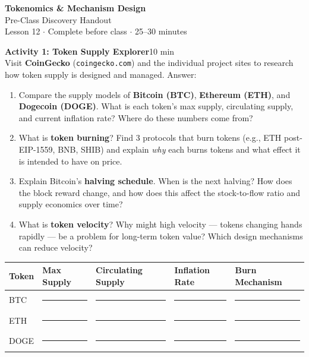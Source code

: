 \documentclass[11pt,a4paper]{article}
\newcommand{\activitybox}[3]{%
  \noindent\colorbox{mllavender4}{\parbox{\dimexpr\linewidth-2\fboxsep}{%
    \textbf{\color{mlpurple}#1}\hfill\textcolor{mlgray}{\small #2}\\[2pt]#3%
  }}\par\vspace{4pt}%
}
\newcommand{\fillcell}{\rule{2.2cm}{0.3pt}}
\begin{document}
\begin{center}
{\LARGE\color{mlpurple}\textbf{Tokenomics \& Mechanism Design}}\\[4pt]
{\large\color{mlblue}Pre-Class Discovery Handout}\\[2pt]
{\small\color{mlgray}Lesson 12 $\cdot$ Complete before class $\cdot$ 25--30 minutes}
\end{center}
\vspace{4pt}

\activitybox{Activity 1: Token Supply Explorer}{10 min}{%
Visit \textbf{CoinGecko} (\texttt{coingecko.com}) and the individual project sites to research how token supply is designed and managed. Answer:
\begin{enumerate}
\item Compare the supply models of \textbf{Bitcoin (BTC)}, \textbf{Ethereum (ETH)}, and \textbf{Dogecoin (DOGE)}. What is each token's max supply, circulating supply, and current inflation rate? Where do these numbers come from?
\item What is \textbf{token burning}? Find 3 protocols that burn tokens (e.g., ETH post-EIP-1559, BNB, SHIB) and explain \emph{why} each burns tokens and what effect it is intended to have on price.
\item Explain Bitcoin's \textbf{halving schedule}. When is the next halving? How does the block reward change, and how does this affect the stock-to-flow ratio and supply economics over time?
\item What is \textbf{token velocity}? Why might high velocity --- tokens changing hands rapidly --- be a problem for long-term token value? Which design mechanisms can reduce velocity?
\end{enumerate}
\vspace{4pt}
{\footnotesize\renewcommand{\arraystretch}{1.35}%
\setlength{\tabcolsep}{5pt}%
\begin{tabular}{@{}p{2.4cm}p{2.8cm}p{2.8cm}p{2.4cm}p{3.2cm}@{}}
\toprule
\textbf{Token} & \textbf{Max Supply} & \textbf{Circulating Supply} & \textbf{Inflation Rate} & \textbf{Burn Mechanism} \\
\midrule
BTC & \fillcell & \fillcell & \fillcell & \fillcell \\
ETH & \fillcell & \fillcell & \fillcell & \fillcell \\
DOGE & \fillcell & \fillcell & \fillcell & \fillcell \\
\bottomrule
\end{tabular}}
\vspace{2pt}
}
\end{document}
